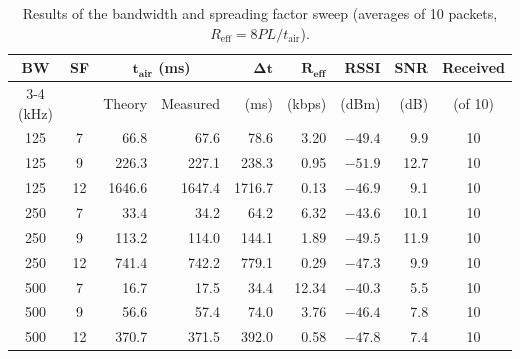 \documentclass[informe,english]{plantilla}
\begin{document}
\begin{table}[htbp]
    \centering
    \small
    \setlength{\tabcolsep}{4.5pt}
    \begin{tabular}{@{}cc rr r r r r c@{}}
        \toprule
        \textbf{BW} & \textbf{SF} & \multicolumn{2}{c}{$\boldsymbol{t_{\text{air}}}$ \textbf{(ms)}} & $\boldsymbol{\Delta t}$ & $\boldsymbol{R_{\text{eff}}}$  & \textbf{RSSI} & \textbf{SNR} & \textbf{Received} \\
        \cmidrule(lr){3-4}
        (kHz) & & Theory & Measured & (ms) & (kbps)  & (dBm) & (dB) & (of 10) \\
        \midrule
        125 & 7  & 66.8   & 67.6   & 78.6   & 3.20    & $-49.4$ & 9.9  & 10 \\
        125 & 9  & 226.3  & 227.1  & 238.3  & 0.95    & $-51.9$ & 12.7 & 10 \\
        125 & 12 & 1646.6 & 1647.4 & 1716.7 & 0.13    & $-46.9$ & 9.1  & 10 \\
        \midrule
        250 & 7  & 33.4   & 34.2   & 64.2   & 6.32    & $-43.6$ & 10.1 & 10 \\
        250 & 9  & 113.2  & 114.0  & 144.1  & 1.89    & $-49.5$ & 11.9 & 10 \\
        250 & 12 & 741.4  & 742.2  & 779.1  & 0.29    & $-47.3$ & 9.9  & 10 \\
        \midrule
        500 & 7  & 16.7   & 17.5   & 34.4   & 12.34  & $-40.3$ & 5.5  & 10 \\
        500 & 9  & 56.6   & 57.4   & 74.0   & 3.76   & $-46.4$ & 7.8  & 10 \\
        500 & 12 & 370.7  & 371.5  & 392.0  & 0.58   & $-47.8$ & 7.4  & 10 \\
        \bottomrule
    \end{tabular}
    \caption{Results of the bandwidth and spreading factor sweep (averages of 10 packets, $R_{\text{eff}} = 8PL/t_{\text{air}}$).}
    \label{tab:bw-results}
\end{table}
\end{document}

